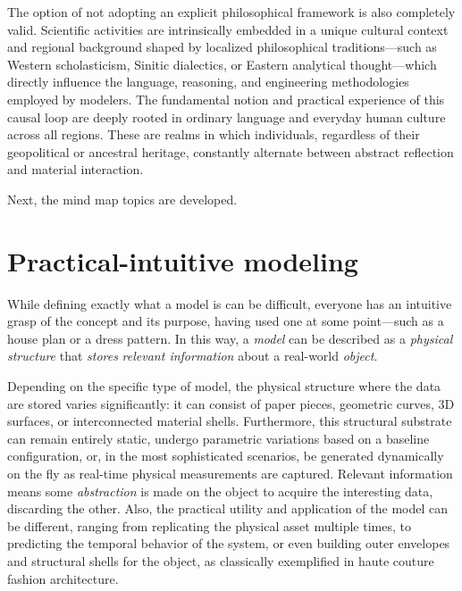 \documentclass[11pt, a4paper]{article}
\begin{document}
The option of not adopting an explicit philosophical framework is also completely valid. Scientific activities are intrinsically embedded in a unique cultural context and regional background shaped by localized philosophical traditions---such as Western scholasticism, Sinitic dialectics, or Eastern analytical thought---which directly influence the language, reasoning, and engineering methodologies employed by modelers. The fundamental notion and practical experience of this causal loop are deeply rooted in ordinary language and everyday human culture across all regions. These are realms in which individuals, regardless of their geopolitical or ancestral heritage, constantly alternate between abstract reflection and material interaction.

Next, the mind map topics are developed.


\section{Practical-intuitive modeling} \label{sec:intuitive}

While defining exactly what a model is can be difficult, everyone has an intuitive grasp of the concept and its purpose, having used one at some point—such as a house plan or a dress pattern. In this way, a \textit{model} can be described as a \textit{physical structure} that \textit{stores} \textit{relevant information} about a real-world \textit{object}.

Depending on the specific type of model, the physical structure where the data are stored varies significantly: it can consist of paper pieces, geometric curves, 3D surfaces, or interconnected material shells. Furthermore, this structural substrate can remain entirely static, undergo parametric variations based on a baseline configuration, or, in the most sophisticated scenarios, be generated dynamically on the fly as real-time physical measurements are captured. Relevant information means some \textit{abstraction} is made on the object to acquire the interesting data, discarding the other. Also, the practical utility and application of the model can be different, ranging from replicating the physical asset multiple times, to predicting the temporal behavior of the system, or even building outer envelopes and structural shells for the object, as classically exemplified in haute couture fashion architecture.
\end{document}
